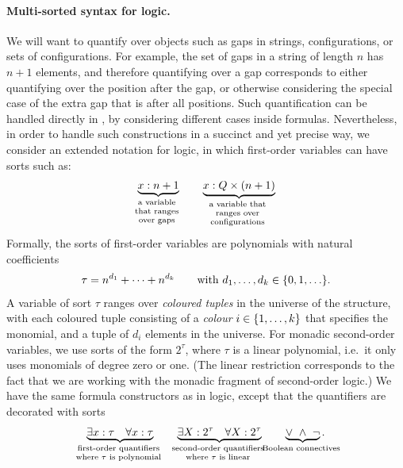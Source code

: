 \paragraph*{Multi-sorted syntax for \mso logic.} We will want to quantify over objects such as gaps in strings,  configurations,  or sets of configurations.  For example, the set of gaps in a string of length $n$ has $n+1$ elements, and therefore quantifying over a gap corresponds to either quantifying over the position after the gap, or otherwise considering the special case of the extra gap that is after all positions. Such quantification can be handled directly in \mso, by considering different cases inside formulas. Nevertheless, in order to handle such constructions  in a succinct and yet precise way, we consider an extended notation for  logic, in which first-order  variables can have sorts such as:
\begin{align}\label{eq:examples-of-type-variables}
\myunderbrace{ x : n+1}{a variable \\ that ranges \\ over gaps}
\qquad 
\myunderbrace{ x : Q \times (n+1)}{a variable  that \\ ranges  over \\ configurations}
\end{align}
Formally, the sorts of first-order variables are polynomials with natural coefficients
    \begin{align*}
    \tau = n^{d_1} + \cdots + n^{d_k} \qquad \text{with $d_1,\ldots,d_k \in \{0,1,\ldots\}$}.
    \end{align*}
A variable of sort $\tau$ ranges over \emph{coloured tuples} in the universe of the structure, with each coloured tuple consisting of a \emph{colour} $i \in \{1,\ldots,k\}$ that specifies the monomial, and a tuple of $d_i$ elements in the universe.  
For monadic second-order  variables, we use sorts of the form  $2^{\tau}$, where $\tau$ is a linear polynomial, i.e.~it only uses monomials of degree zero or one. (The linear restriction  corresponds to the fact that we are working with the monadic fragment of  second-order logic.)  We have the same formula constructors as in \mso logic, except that the quantifiers are decorated with sorts
\begin{align*}
\myunderbrace{\exists x : \tau \quad \forall x : \tau}{first-order quantifiers\\ where $\tau$ is polynomial}
\qquad 
\myunderbrace{\exists X : 2^\tau \quad \forall X : 2^\tau}{second-order quantifiers \\ where $\tau$ is linear}
\qquad 
\myunderbrace{\lor \ \land \  \neg}{Boolean connectives}.
\end{align*}
